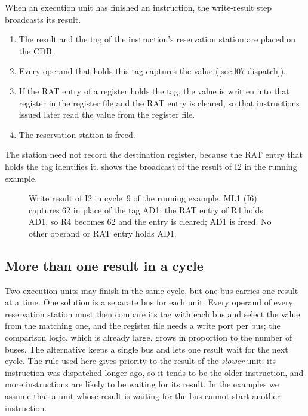 \documentclass[../main.tex]{subfiles}
\begin{document}
When an execution unit has finished an instruction, the write-result step
broadcasts its result.
\begin{enumerate}
  \item The result and the tag of the instruction's reservation station are
    placed on the CDB.
  \item Every operand that holds this tag captures the value
    (\cref{sec:l07-dispatch}).
  \item If the RAT entry of a register holds the tag, the value is written
    into that register in the register file and the RAT entry is cleared, so
    that instructions issued later read the value from the register file.
  \item The reservation station is freed.
\end{enumerate}
The station need not record the destination register, because the RAT entry
that holds the tag identifies it.   shows the
broadcast of the result of I2 in the running example.

\begin{figure}[htbp]
  \centering
  
  \caption{Write result of I2 in cycle~9 of the running example.  ML1 (I6)
    captures 62 in place of the tag AD1; the RAT entry of R4 holds AD1, so
    R4 becomes 62 and the entry is cleared; AD1 is freed.  No other operand
    or RAT entry holds AD1.}
  \label{fig:l07-broadcast}
\end{figure}

\subsection{More than one result in a cycle}
\label{sec:l07-cdb-conflict}

Two execution units may finish in the same cycle, but one bus carries one
result at a time.  One solution is a separate
bus for each unit.  Every operand of every reservation station must then
compare its tag with each bus and select the value from the matching one, and
the register file needs a write port per bus; the comparison logic, which is
already large, grows in proportion to the number of buses.  The alternative
keeps a single bus and lets one result wait for the next cycle.  The rule
used here gives priority to the result of the \emph{slower} unit: its
instruction was dispatched longer ago, so it tends to be the older
instruction, and more instructions are likely to be waiting for its result.
In the examples we assume that a unit whose result is waiting for the bus
cannot start another instruction.
\end{document}
